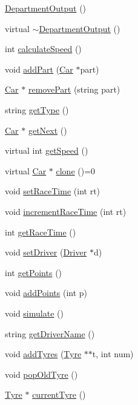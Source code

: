 \begin{DoxyCompactItemize}
\item 
\hyperlink{classDepartmentOutput_af48d2aeafaead9c3f77c506112d80ca8}{Department\+Output} ()
\item 
virtual \hyperlink{classDepartmentOutput_afd3aeb3b20f1215d15f7b0498f6c6acb}{$\sim$\+Department\+Output} ()
\item 
int \hyperlink{classDepartmentOutput_a34d5c432ee7e7e8a33a4e8099a2c751f}{calculate\+Speed} ()
\item 
void \hyperlink{classDepartmentOutput_a8b39539ad1ca3d8026d53dd5ab88be97}{add\+Part} (\hyperlink{classCar}{Car} $\ast$part)
\item 
\hyperlink{classCar}{Car} $\ast$ \hyperlink{classDepartmentOutput_a8bd91d321113668938ecb8fb549d972c}{remove\+Part} (string part)
\item 
string \hyperlink{classDepartmentOutput_a9366794b5b64ed37cf37ed6443eecf01}{get\+Type} ()
\item 
\hyperlink{classCar}{Car} $\ast$ \hyperlink{classDepartmentOutput_ab12d572677cc6c3a4b32cc1c5894f54e}{get\+Next} ()
\item 
virtual int \hyperlink{classDepartmentOutput_a90caf8934a687d18b9855f19a421ecef}{get\+Speed} ()
\item 
virtual \hyperlink{classCar}{Car} $\ast$ \hyperlink{classDepartmentOutput_ab20c9d559bca6ce8e6748dfac47c3f84}{clone} ()=0
\item 
void \hyperlink{classDepartmentOutput_a99c1b2cf729b25bc2f1d48214019c678}{set\+Race\+Time} (int rt)
\item 
void \hyperlink{classDepartmentOutput_a64f6b8afd2702b4d223c4cac0909b470}{increment\+Race\+Time} (int rt)
\item 
int \hyperlink{classDepartmentOutput_af4807c0cdde8488cd922be5d15a0f59b}{get\+Race\+Time} ()
\item 
void \hyperlink{classDepartmentOutput_aa045362e5763d57a2c888b98c677773c}{set\+Driver} (\hyperlink{classDriver}{Driver} $\ast$d)
\item 
int \hyperlink{classDepartmentOutput_ac1eac849b183dd78906a5b2a7217b8ef}{get\+Points} ()
\item 
void \hyperlink{classDepartmentOutput_a6ce74748aa402298902e378ff47c1e49}{add\+Points} (int p)
\item 
void \hyperlink{classDepartmentOutput_a3c189e28c9d8899afafe3d6ee7d7602d}{simulate} ()
\item 
string \hyperlink{classDepartmentOutput_a5c2bbaa1979ecbbd06629440884966a0}{get\+Driver\+Name} ()
\item 
void \hyperlink{classDepartmentOutput_a7f231762cf94d1f18a2e7bb3290afbda}{add\+Tyres} (\hyperlink{classTyre}{Tyre} $\ast$$\ast$t, int num)
\item 
void \hyperlink{classDepartmentOutput_a9c1846e268ea5e85eb623d8011f204f5}{pop\+Old\+Tyre} ()
\item 
\hyperlink{classTyre}{Tyre} $\ast$ \hyperlink{classDepartmentOutput_aca95508fd9145baea4e7a32448fa653b}{current\+Tyre} ()
\end{DoxyCompactItemize}
